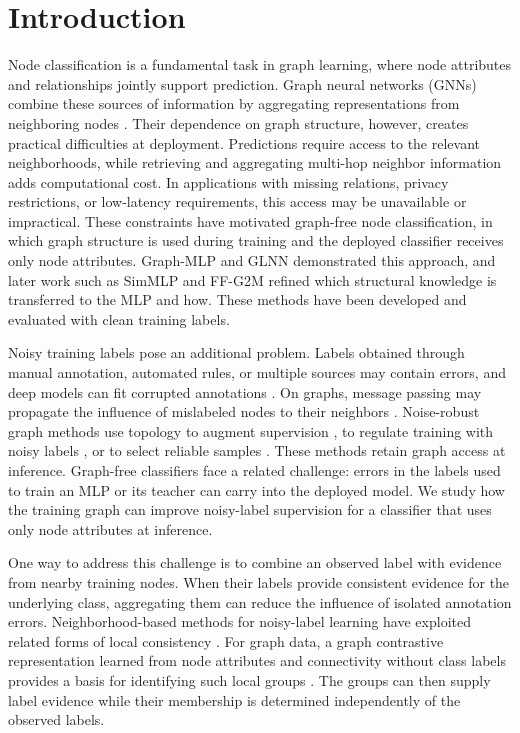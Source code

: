 \documentclass[10pt,letterpaper,nopreprintline]{elsarticle}
\theoremstyle{plain}
\begin{document}
\FloatBarrier

\section{Introduction}\label{sec:1}

Node classification is a fundamental task in graph learning, where node attributes and relationships jointly support prediction. Graph neural networks (GNNs) combine these sources of information by aggregating representations from neighboring nodes \cite{ref1,ref2}. Their dependence on graph structure, however, creates practical difficulties at deployment. Predictions require access to the relevant neighborhoods, while retrieving and aggregating multi-hop neighbor information adds computational cost. In applications with missing relations, privacy restrictions, or low-latency requirements, this access may be unavailable or impractical. These constraints have motivated graph-free node classification, in which graph structure is used during training and the deployed classifier receives only node attributes. Graph-MLP \cite{ref3} and GLNN \cite{ref4} demonstrated this approach, and later work such as SimMLP \cite{ref41} and FF-G2M \cite{ref45} refined which structural knowledge is transferred to the MLP and how. These methods have been developed and evaluated with clean training labels.

Noisy training labels pose an additional problem. Labels obtained through manual annotation, automated rules, or multiple sources may contain errors, and deep models can fit corrupted annotations \cite{ref5}. On graphs, message passing may propagate the influence of mislabeled nodes to their neighbors \cite{ref6}. Noise-robust graph methods use topology to augment supervision \cite{ref7}, to regulate training with noisy labels \cite{ref8}, or to select reliable samples \cite{ref9}. These methods retain graph access at inference. Graph-free classifiers face a related challenge: errors in the labels used to train an MLP or its teacher can carry into the deployed model. We study how the training graph can improve noisy-label supervision for a classifier that uses only node attributes at inference.

One way to address this challenge is to combine an observed label with evidence from nearby training nodes. When their labels provide consistent evidence for the underlying class, aggregating them can reduce the influence of isolated annotation errors. Neighborhood-based methods for noisy-label learning have exploited related forms of local consistency \cite{ref10,ref11}. For graph data, a graph contrastive representation learned from node attributes and connectivity without class labels provides a basis for identifying such local groups \cite{ref12}. The groups can then supply label evidence while their membership is determined independently of the observed labels.
\end{document}
